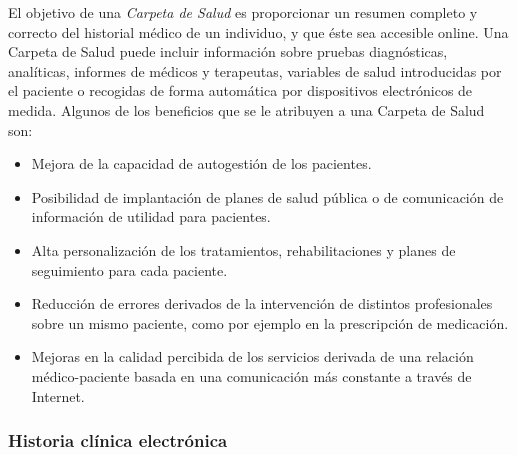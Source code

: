 El objetivo de una \textit{Carpeta de Salud} es proporcionar un resumen completo y correcto del historial médico de un individuo, y que éste sea accesible online.
Una Carpeta de Salud puede incluir información sobre pruebas diagnósticas, analíticas, informes de médicos y terapeutas,
 variables de salud introducidas por el paciente o recogidas de forma automática por dispositivos electrónicos de medida.
Algunos de los beneficios que se le atribuyen a una Carpeta de Salud son:
	\begin{itemize}
        \item Mejora de la capacidad de autogestión de los pacientes.
	    \item Posibilidad de implantación de planes de salud pública o de comunicación de información de utilidad para pacientes.
	    \item Alta personalización de los tratamientos, rehabilitaciones y planes de seguimiento para cada paciente.
	    \item Reducción de errores derivados de la intervención de distintos profesionales sobre un mismo paciente, como por ejemplo en la prescripción de medicación.
	    \item Mejoras en la calidad percibida de los servicios derivada de una relación médico-paciente basada en una comunicación más constante a través de Internet.
	\end{itemize}


\subsubsection{Historia clínica electrónica}

